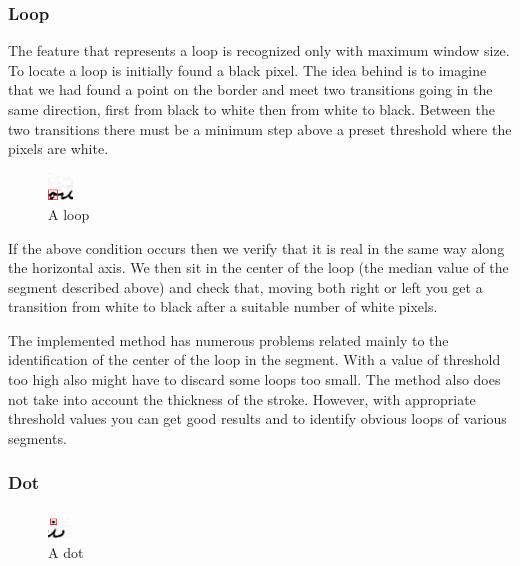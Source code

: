 \subsubsection{Loop}

The feature that represents a loop is recognized only with maximum window size.
To locate a loop is initially found a black pixel. The idea behind is to imagine that we had found a point on the border and meet two transitions going in the same direction, first from black to white then from white to black. Between the two transitions there must be a minimum step above a preset threshold where the pixels are white.

\begin{figure}
  \vspace{-20pt}
  \begin{center}
    \includegraphics[width=0.06\textwidth]{images/loop.jpg}
  \end{center}
  \vspace{-20pt}
  \caption{A loop}
  \vspace{-10pt}
\end{figure}

If the above condition occurs then we verify that it is real in the same way along the horizontal axis. We then sit in the center of the loop (the median value of the segment described above) and check that, moving both right or left you get a transition from white to black after a suitable number of white pixels.

The implemented method has numerous problems related mainly to the identification of the center of the loop in the segment. With a value of threshold too high also might have to discard some loops too small. The method also does not take into account the thickness of the stroke.
However, with appropriate threshold values you can get good results and to identify obvious loops of various segments.

\subsubsection{Dot}

\begin{figure}
  \vspace{-20pt}
  \begin{center}
    \includegraphics[width=0.06\textwidth]{images/dot}
  \end{center}
  \vspace{-20pt}
  \caption{A dot}
  \vspace{-10pt}
\end{figure}

